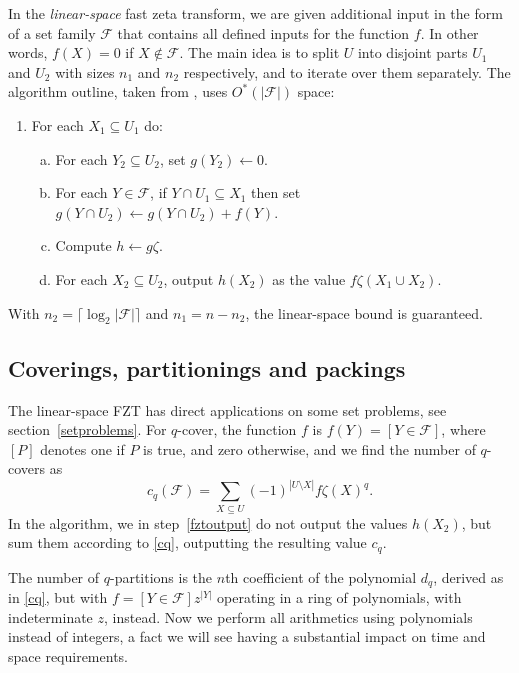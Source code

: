 \documentclass{cslthse-msc}
\begin{document}
In the \emph{linear-space} fast zeta transform, we are given additional input in the form of a set family $\mathcal{F}$ that contains all defined inputs for the function $f$. In other words, $f(X) = 0$ if $X \notin \mathcal{F}$. The main idea is to split $U$ into disjoint parts $U_1$ and $U_2$ with sizes $n_1$ and $n_2$ respectively, and to iterate over them separately. The algorithm outline, taken from \cite[sec.3]{cov_pack}, uses $O^*(|\mathcal{F}|)$ space:

\begin{enumerate}[1.]
 \item For each $X_1 \subseteq U_1$ do:
 \begin{enumerate}[a)]
  \item For each $Y_2 \subseteq U_2$, set $g(Y_2) \leftarrow 0$.
  \item For each $Y \in \mathcal{F}$, if $Y \cap U_1 \subseteq X_1$ then set $g(Y \cap U_2) \leftarrow g(Y \cap U_2) + f(Y)$.
  \item Compute $h \leftarrow g\zeta$.
  \item For each $X_2 \subseteq U_2$, output $h(X_2)$ as the value $f\zeta(X_1 \cup X_2)$. \label{fztoutput}
 \end{enumerate}
\end{enumerate}
With $n_2 = \lceil \log_2|\mathcal{F}| \rceil$ and $n_1 = n - n_2$, the linear-space bound is guaranteed.

\subsection{Coverings, partitionings and packings}
The linear-space FZT has direct applications on some set problems, see section~\ref{setproblems}. For $q$-cover, the function $f$ is $f(Y) = [ Y \in \mathcal{F} ]$, where $[P]$ denotes one if $P$ is true, and zero otherwise, and we find the number of $q$-covers as 
\begin{equation} \label{cq}
c_q(\mathcal{F}) = \sum_{X \subseteq U} (-1)^{|U \setminus X|} f\zeta(X)^q.
\end{equation}
In the algorithm, we in step~\ref{fztoutput} do not output the values $h(X_2)$, but sum them according to \ref{cq}, outputting the resulting value $c_q$.

The number of $q$-partitions is the $n$th coefficient of the polynomial $d_q$, derived as in \ref{cq}, but with $f = [Y \in \mathcal{F}]z^{|Y|}$ operating in a ring of polynomials, with indeterminate $z$, instead. Now we perform all arithmetics using polynomials instead of integers, a fact we will see having a substantial impact on time and space requirements.
\end{document}
